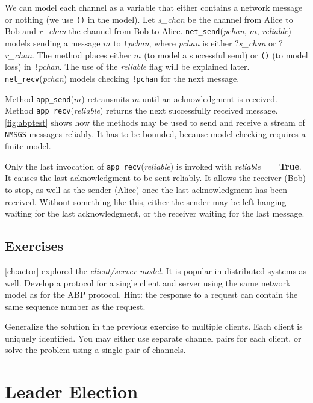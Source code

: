 \documentclass{report}
\begin{document}
We can model each
channel as a variable that either contains a network message or nothing
(we use \texttt{()} in the model).  Let \textit{s\_chan} be the channel
from Alice to Bob and \textit{r\_chan} the channel from Bob to Alice.
\texttt{net\_send}(\textit{pchan}, $m$, \textit{reliable}) models sending
a message $m$ to
\texttt{!}\textit{pchan}, where \textit{pchan} is either ?\textit{s\_chan}
or ?\textit{r\_chan}.
The method places either $m$ (to model a successful send)
or \texttt{()} (to model loss) in \texttt{!}\textit{pchan}.
The use of the \textit{reliable} flag will be explained later.
\texttt{net\_recv}(\textit{pchan}) models checking \texttt{!pchan} for
the next message.

Method \texttt{app\_send}($m$) retransmits $m$ until
an acknowledgment is received.
Method \texttt{app\_recv}(\textit{reliable}) returns the next successfully received
message.
\autoref{fig:abptest} shows how the methods may be used to send and receive
a stream of \texttt{NMSGS} messages reliably.
It has to be bounded, because model checking requires a finite model.

Only the last invocation of \texttt{app\_recv}(\textit{reliable}) is invoked with
\textit{reliable} == \textbf{True}.  It causes the last acknowledgment to be sent
reliably.  It allows the receiver (Bob) to stop, as well as the sender (Alice)
once the last acknowledgment has been received.
Without something like this, either the sender may be left hanging waiting
for the last acknowledgment, or the receiver waiting for the last message.

\section*{Exercises}
\begin{problems}
\item \autoref{ch:actor} explored the \emph{client/server model}.  It is popular
in distributed systems as well.
Develop a protocol for a single client and server using the same network
model as for the ABP protocol.
Hint: the response to a request can contain the same sequence number as the
request.
\item Generalize the solution in the previous exercise to multiple clients.
Each client is uniquely identified.  You may either use separate channel pairs
for each client, or solve the problem using a single pair of channels.
\end{problems}

\chapter{Leader Election}
\label{ch:leader}
\end{document}
